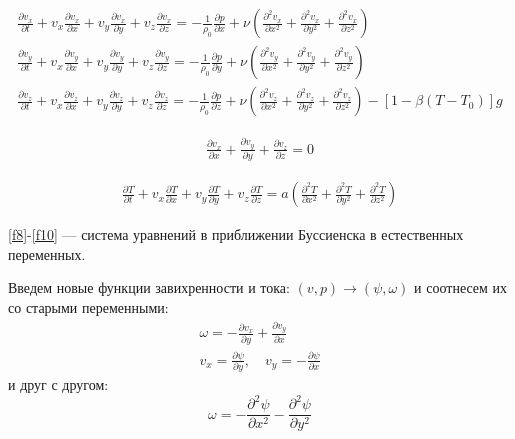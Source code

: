 \documentclass[a4paper, 12pt]{article}
\newcommand{\der}[2]{\frac{\partial {#1}}{\partial {#2}}}
\newcommand{\dder}[2]{\frac{\partial^2 {#1}}{\partial {#2}^2}}
\begin{document}
    \begin{equation}
    \begin{gathered}
    \label{f8}
    \frac{\partial v_x}{\partial t} + v_x\frac{\partial v_x}{\partial x} + v_y\frac{\partial v_x}{\partial y} + v_z \frac{\partial v_x}{\partial z} = -\frac{1}{\rho_0}\frac{\partial p}{\partial x} + \nu \left(\frac{\partial^2 v_x}{\partial x^2} + \frac{\partial^2 v_x}{\partial y^2} + \frac{\partial^2 v_x}{\partial z^2}\right)\\
    \frac{\partial v_y}{\partial t} + v_x\frac{\partial v_y}{\partial x} + v_y\frac{\partial v_y}{\partial y} + v_z \frac{\partial v_y}{\partial z} = -\frac{1}{\rho_0}\frac{\partial p}{\partial y} + \nu \left(\frac{\partial^2 v_y}{\partial x^2} + \frac{\partial^2 v_y}{\partial y^2} + \frac{\partial^2 v_y}{\partial z^2}\right)\\
    \frac{\partial v_z}{\partial t} + v_x\frac{\partial v_z}{\partial x} + v_y\frac{\partial v_z}{\partial y} + v_z \frac{\partial v_z}{\partial z} = -\frac{1}{\rho_0}\frac{\partial p}{\partial z} + \nu \left(\frac{\partial^2 v_z}{\partial x^2} + \frac{\partial^2 v_z}{\partial y^2} + \frac{\partial^2 v_z}{\partial z^2}\right) - [1-\beta(T-T_0)]g
    \end{gathered}
    \end{equation}

    \begin{equation}
    \begin{gathered}
    \label{f9}
    \frac{\partial v_x}{\partial x} + \frac{\partial v_y}{\partial y} + \frac{\partial v_z}{\partial z} =0
    \end{gathered}
    \end{equation}

    \begin{equation}
    \begin{gathered}
    \label{f10}
    \frac{\partial T}{\partial t} + v_x \frac{\partial T}{\partial x}+ v_y \frac{\partial T}{\partial y} + v_z \frac{\partial T}{\partial z} = a(\frac{\partial^2 T}{\partial x^2} + \frac{\partial^2 T}{\partial y^2} + \frac{\partial^2 T}{\partial z^2})
    \end{gathered}
    \end{equation}

    \eqref{f8}-\eqref{f10} --- система уравнений в приближении Буссиенска в естественных переменных.

    Введем новые функции завихренности и тока: $(v,p) \to (\psi, \omega)$ и
    соотнесем их со старыми переменными:
    \begin{gather*}
      \omega = - \der{v_x}{y} + \der{v_y}{x}
      \\
      v_x = \der{\psi}{y}, \quad v_y = - \der{\psi}{x}
    \end{gather*}
    и друг с другом:
    $$
      \omega = - \dder{\psi}{x} - \dder{\psi}{y}
    $$
\end{document}
